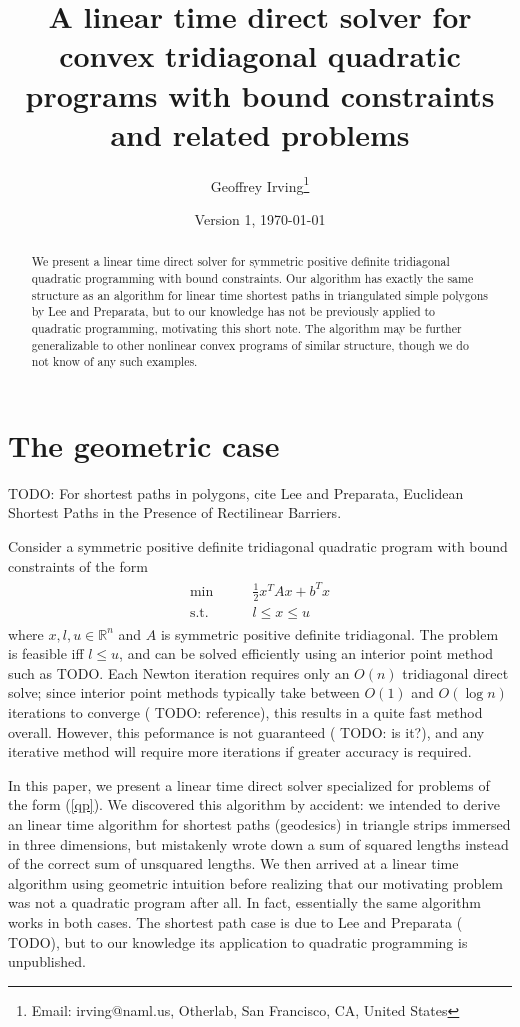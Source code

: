 \documentclass[11pt]{article}
\title{A linear time direct solver for convex tridiagonal quadratic programs with bound constraints and related problems}
\author{Geoffrey Irving\thanks{Email: irving@naml.us, Otherlab, San Francisco, CA, United States}}
\date{Version 1, \today}
\newcommand{\R}{\mathbb{R}}
\newcommand{\TODO}{{\color{red} TODO}}
\begin{document}
\maketitle

\begin{abstract}
We present a linear time direct solver for symmetric positive definite tridiagonal quadratic programming with bound constraints.  Our algorithm has exactly the same structure as an
algorithm for linear time shortest paths in triangulated simple polygons by Lee and Preparata, but to our knowledge has not be previously applied to quadratic programming, motivating
this short note.  The algorithm may be further generalizable to other nonlinear convex programs of similar structure, though we do not know of any such examples.
\end{abstract}

\section{The geometric case}

\TODO: For shortest paths in polygons, cite Lee and Preparata, Euclidean Shortest Paths in the Presence of Rectilinear Barriers.

Consider a symmetric positive definite tridiagonal quadratic program with bound constraints of the form
\begin{align} \label{qp}
\begin{array}{cc}
\min          \qquad& \frac{1}{2} x^T A x + b^T x \\
\textrm{s.t.} & l \le x \le u
\end{array}
\end{align}
where $x,l,u \in \R^n$ and $A$ is symmetric positive definite tridiagonal.  The problem is feasible iff $l \le u$, and can be solved efficiently using an interior point method such as \TODO.  Each Newton iteration
requires only an $O(n)$ tridiagonal direct solve; since interior point methods typically take between $O(1)$ and $O(\log n)$ iterations to converge (\TODO: reference), this results in a quite fast method overall.
However, this peformance is not guaranteed (\TODO: is it?), and any iterative method will require more iterations if greater accuracy is required.

In this paper, we present a linear time direct solver specialized for problems of the form (\ref{qp}).  We discovered this algorithm by accident: we intended to derive an linear time algorithm
for shortest paths (geodesics) in triangle strips immersed in three dimensions, but mistakenly wrote down a sum of squared lengths instead of the correct sum of unsquared lengths.  We then arrived at a linear time algorithm
using geometric intuition before realizing that our motivating problem was not a quadratic program after all.  In fact, essentially the same algorithm works in both cases.  The shortest path case is due to
Lee and Preparata (\TODO), but to our knowledge its application to quadratic programming is unpublished.
\end{document}
